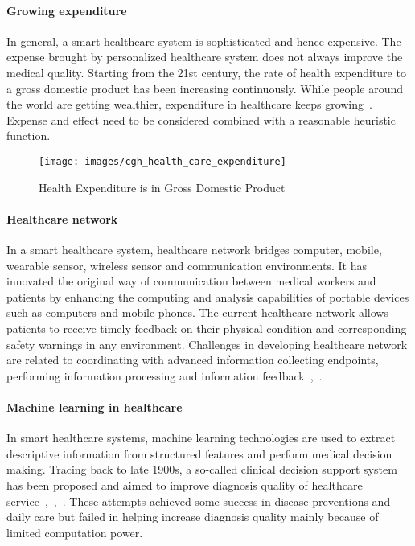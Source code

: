 \documentclass[letterpaper, twocolumn, 10pt, conference]{IEEEtran}
\begin{document}
\paragraph{Growing expenditure}


In general, a smart healthcare system is sophisticated and hence expensive. The expense brought by personalized healthcare system does not always improve the medical quality. Starting from the 21st century, the rate of health expenditure to a gross domestic product has been increasing continuously. While people around the world are getting wealthier, expenditure in healthcare keeps growing~\cite{hc_paper_34}. Expense and effect need to be considered combined with a reasonable heuristic function.


\begin{figure}[h!]
        \centering
        \texttt{[image: images/cgh\_health\_care\_expenditure]}
        \caption{Health Expenditure is in Gross Domestic Product}
        \label{fig:cgh:expenditure}
\end{figure}

\paragraph{Healthcare network}


In a smart healthcare system, healthcare network bridges computer, mobile, wearable sensor, wireless sensor and communication environments. It has innovated the original way of communication between medical workers and patients by enhancing the computing and analysis capabilities of portable devices such as computers and mobile phones. The current healthcare network allows patients to receive timely feedback on their physical condition and corresponding safety warnings in any environment. Challenges in developing healthcare network are related to coordinating with advanced information collecting endpoints, performing information processing and information feedback~\cite{hc_paper_14},~\cite{hc_paper_15}.


\paragraph{Machine learning in healthcare}


In smart healthcare systems, machine learning technologies are used to extract descriptive information from structured features and perform medical decision making. Tracing back to late 1900s, a so-called clinical decision support system has been proposed and aimed to improve diagnosis quality of healthcare service~\cite{hc_review_3},~\cite{hc_review_5},~\cite{hc_review_3}. These attempts achieved some success in disease preventions and daily care but failed in helping increase diagnosis quality mainly because of limited computation power.
\end{document}
